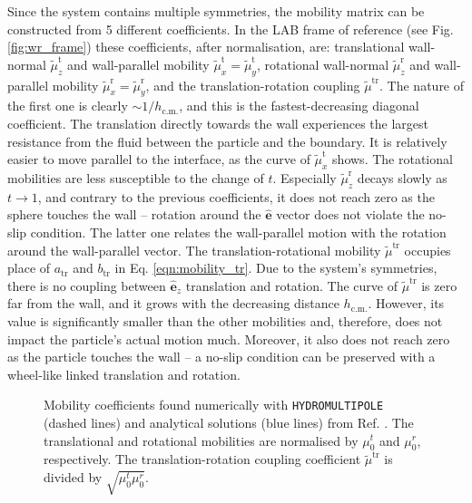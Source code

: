 \documentclass{master_thesis}
\def\code#1{\texttt{#1}}
\begin{document}
Since the system contains multiple symmetries, the mobility matrix can be constructed from 5 different coefficients. In the LAB frame of reference (see Fig. \ref{fig:wr_frame}) these coefficients, after normalisation, are: translational wall-normal $\tilde{\mu}_z^{\textrm{t}}$ and wall-parallel mobility $\tilde{\mu}_x^{\textrm{t}}=\tilde{\mu}_y^{\textrm{t}}$, rotational wall-normal $\tilde{\mu}_z^{\textrm{r}}$ and wall-parallel mobility $\tilde{\mu}_x^{\textrm{r}}=\tilde{\mu}_y^{\textrm{r}}$, and the translation-rotation coupling $\tilde{\mu}^{\textrm{tr}}$. The nature of the first one is clearly $\sim 1 / h_{\textrm{c.m.}}$, and this is the fastest-decreasing diagonal coefficient. The translation directly towards the wall experiences the largest resistance from the fluid between the particle and the boundary. It is relatively easier to move parallel to the interface, as the curve of $\tilde{\mu}_x^{\textrm{t}}$ shows. The rotational mobilities are less susceptible to the change of $t$. Especially $\tilde{\mu}_z^{\textrm{r}}$ decays slowly as $t\rightarrow 1$, and contrary to the previous coefficients, it does not reach zero as the sphere touches the wall -- rotation around the $\hat{\boldsymbol{e}}$ vector does not violate the no-slip condition. The latter one relates the wall-parallel motion with the rotation around the wall-parallel vector. The translation-rotational mobility $\tilde{\mu}^{\textrm{tr}}$ occupies place of $a_{\textrm{tr}}$ and $b_{\textrm{tr}}$ in Eq. \eqref{eqn:mobility_tr}. Due to the system's symmetries, there is no coupling between $\hat{\boldsymbol{e}}_z$ translation and rotation. The curve of $\tilde{\mu}^{\textrm{tr}}$ is zero far from the wall, and it grows with the decreasing distance $h_{\textrm{c.m.}}$. However, its value is significantly smaller than the other mobilities and, therefore, does not impact the particle's actual motion much. Moreover, it also does not reach zero as the particle touches the wall -- a no-slip condition can be preserved with a wheel-like linked translation and rotation.

\begin{figure}
    \centering
    
    \caption{Mobility coefficients found numerically with \code{HYDROMULTIPOLE} (dashed lines) and analytical solutions (blue lines) from Ref. \cite{cichocki1998}. The translational and rotational mobilities are normalised by $\mu^t_0$ and $\mu^r_0$, respectively. The translation-rotation coupling coefficient $\tilde{\mu}^{\textrm{tr}}$ is divided by $\sqrt{\mu^t_0 \mu^r_0}$.}
    \label{fig:single_sphere_mobility}
\end{figure}
\end{document}
